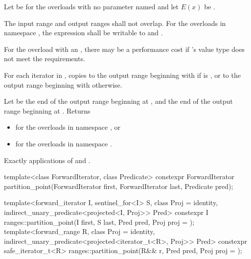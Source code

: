 \begin{itemdescr}
\pnum
Let  be 
for the overloads with no parameter named  and
let $E(x)$ be .

\pnum
\requires
The input range and output ranges shall not overlap.
For the overloads in namespace ,
the expression 
shall be writable
to  and .
\begin{note}
For the overload with an ,
there may be a performance cost if 's value type
does not meet the  requirements.
\end{note}

\pnum
\effects
For each iterator  in ,
copies  to the output range beginning with 
if  is , or
to the output range beginning with  otherwise.

\pnum
\returns
Let  be the end of the output range beginning at ,
and  the end of the output range beginning at .
Returns
\begin{itemize}
\item {} for the overloads in namespace , or
\item {} for the overloads in namespace .
\end{itemize}

\pnum
\complexity
Exactly  applications of  and .
\end{itemdescr}

%
\begin{itemdecl}
template<class ForwardIterator, class Predicate>
  constexpr ForwardIterator
    partition_point(ForwardIterator first, ForwardIterator last, Predicate pred);

template<forward_iterator I, sentinel_for<I> S, class Proj = identity,
         indirect_unary_predicate<projected<I, Proj>> Pred>
  constexpr I ranges::partition_point(I first, S last, Pred pred, Proj proj = {});
template<forward_range R, class Proj = identity,
         indirect_unary_predicate<projected<iterator_t<R>, Proj>> Pred>
  constexpr safe_iterator_t<R>
    ranges::partition_point(R&& r, Pred pred, Proj proj = {});
\end{itemdecl}

